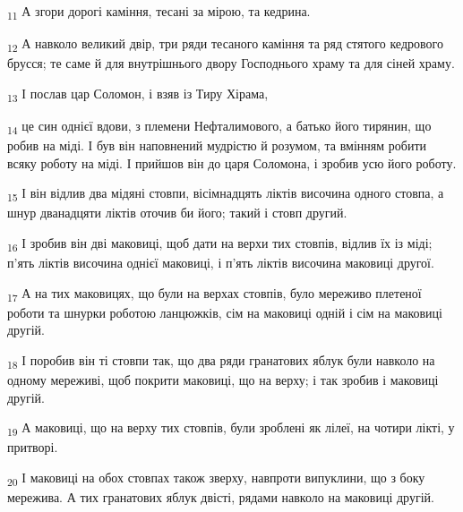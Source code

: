 \begin{tcolorbox}
\textsubscript{11} А згори дорогі каміння, тесані за мірою, та кедрина.
\end{tcolorbox}
\begin{tcolorbox}
\textsubscript{12} А навколо великий двір, три ряди тесаного каміння та ряд стятого кедрового брусся; те саме й для внутрішнього двору Господнього храму та для сіней храму.
\end{tcolorbox}
\begin{tcolorbox}
\textsubscript{13} І послав цар Соломон, і взяв із Тиру Хірама,
\end{tcolorbox}
\begin{tcolorbox}
\textsubscript{14} це син однієї вдови, з племени Нефталимового, а батько його тирянин, що робив на міді. І був він наповнений мудрістю й розумом, та вмінням робити всяку роботу на міді. І прийшов він до царя Соломона, і зробив усю його роботу.
\end{tcolorbox}
\begin{tcolorbox}
\textsubscript{15} І він відлив два мідяні стовпи, вісімнадцять ліктів височина одного стовпа, а шнур дванадцяти ліктів оточив би його; такий і стовп другий.
\end{tcolorbox}
\begin{tcolorbox}
\textsubscript{16} І зробив він дві маковиці, щоб дати на верхи тих стовпів, відлив їх із міді; п'ять ліктів височина однієї маковиці, і п'ять ліктів височина маковиці другої.
\end{tcolorbox}
\begin{tcolorbox}
\textsubscript{17} А на тих маковицях, що були на верхах стовпів, було мереживо плетеної роботи та шнурки роботою ланцюжків, сім на маковиці одній і сім на маковиці другій.
\end{tcolorbox}
\begin{tcolorbox}
\textsubscript{18} І поробив він ті стовпи так, що два ряди гранатових яблук були навколо на одному мереживі, щоб покрити маковиці, що на верху; і так зробив і маковиці другій.
\end{tcolorbox}
\begin{tcolorbox}
\textsubscript{19} А маковиці, що на верху тих стовпів, були зроблені як лілеї, на чотири лікті, у притворі.
\end{tcolorbox}
\begin{tcolorbox}
\textsubscript{20} І маковиці на обох стовпах також зверху, навпроти випуклини, що з боку мережива. А тих гранатових яблук двісті, рядами навколо на маковиці другій.
\end{tcolorbox}
